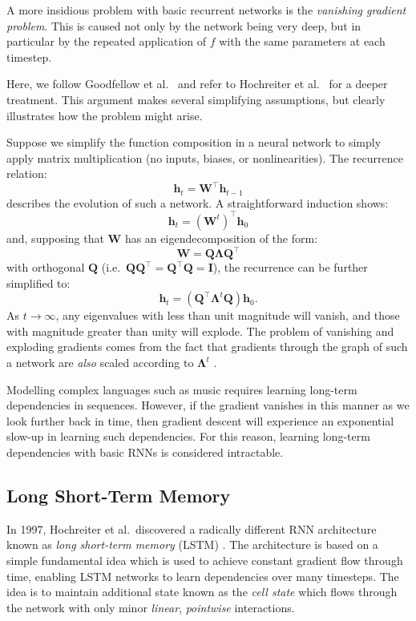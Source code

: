 \documentclass[12pt,a4paper,twoside,openright]{report}
\newcommand{\vect}[1]{\boldsymbol{\mathbf{#1}}}
\begin{document}
A more insidious problem with basic recurrent networks is the \emph{vanishing
gradient problem}. This is caused not only by the network being very deep, but
in particular by the repeated application of $f$ with the same parameters at
each timestep.

Here, we follow Goodfellow et al.\ \cite{Goodfellow-et-al-2016} and refer to
Hochreiter et al.\ \cite{hochreiter1997long} for a deeper treatment.
This argument makes several simplifying assumptions, but clearly illustrates how
the problem might arise.

Suppose we simplify the function composition in a neural network to simply apply
matrix multiplication (no inputs, biases, or nonlinearities). The
recurrence relation: 
$$ \vect{h}_t = \vect{W}^\top \vect{h}_{t-1} $$ 
describes the evolution of such a network. A straightforward induction shows:
$$ \vect{h}_t = (\vect{W}^t)^\top\vect{h}_0 $$
and, supposing that $\vect{W}$ has an eigendecomposition of the form:
$$ \vect{W} = \vect{Q}\vect{\Lambda}\vect{Q}^\top $$
with orthogonal $\vect{Q}$ (i.e.\ $\vect{Q}\vect{Q}^\top = \vect{Q}^\top\vect{Q}
= \vect{I}$), the recurrence can be further simplified to:
$$ \vect{h}_t = (\vect{Q}^\top \vect{\Lambda}^t \vect{Q}) \vect{h}_0. $$
As $t \rightarrow \infty$, any eigenvalues with less than unit magnitude will
vanish, and those with magnitude greater than unity will explode. The problem of
vanishing and exploding gradients comes from the fact that gradients through the
graph of such a network are \emph{also} scaled according to $\vect{\Lambda}^t$
\cite{Goodfellow-et-al-2016}.

Modelling complex languages such as music requires learning long-term
dependencies in sequences. However, if the gradient vanishes in this manner as
we look further back in time, then gradient descent will experience an
exponential slow-up in learning such dependencies. For this reason, learning
long-term dependencies with basic RNNs is considered intractable.

\subsection{Long Short-Term Memory}\label{sec:lstm-prep}

In 1997, Hochreiter et al.\ discovered a radically different RNN architecture
known as \emph{long short-term memory} (LSTM) \cite{hochreiter1997long}. The
architecture is based on a simple fundamental idea which is used to achieve
constant gradient flow through time, enabling LSTM networks to learn
dependencies over many timesteps. The idea is to maintain additional state known
as the \emph{cell state} which flows through the network with only minor
\emph{linear}, \emph{pointwise} interactions.
\end{document}
